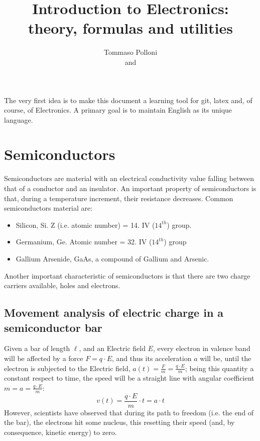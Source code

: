 \documentclass[12pt]{article}
\begin{document}
 
 
 
\title{Introduction to Electronics:\\
theory, formulas and utilities}
\author{Tommaso Polloni\\
and }
 
 The very first idea is to make this document a learning tool for git, latex and, of course, of Electronics. A primary goal is to maintain English as its unique language.
\maketitle
\tableofcontents

\section{Semiconductors} 
Semiconductors are material with an electrical conductivity value falling between that of a conductor and an insulator.
An important property of semiconductors is that, during a temperature increment, their resistance decreases.
Common semiconductors material are:
\begin{itemize}
	\item {}Silicon, Si. Z (i.e. atomic number) = 14. IV ($14^{th}$) group.
	\item Germanium, Ge. Atomic number = 32. IV ($14^{th}$) group
	\item Gallium Arsenide, GaAs, a compound of Gallium and Arsenic.
\end{itemize}
Another important characteristic of semiconductors is that there are two charge carriers available, holes and electrons.

\subsection{Movement analysis of electric charge in a semiconductor bar}
Given a bar of length $\ell$, and an Electric field $E$, every electron in valence band will be affected by a force $F = q \cdot E$, and thus its acceleration $a$ will be, until the electron is subjected to the Electric field, $a(t)= \frac{F}{m} = \frac{q \cdot E}{m}$; being this quantity a constant respect to time, the speed will be a straight line with angular coefficient $m = a = \frac{q \cdot E}{ m}$:
\begin{equation}
	v(t) = \frac{q \cdot E}{m} \cdot t = a \cdot t
\end{equation}
However, scientists have observed that during its path to freedom (i.e. the end of the bar), the electrons hit some nucleus, this resetting their speed (and, by consequence, kinetic energy) to zero. 
\end{document}
